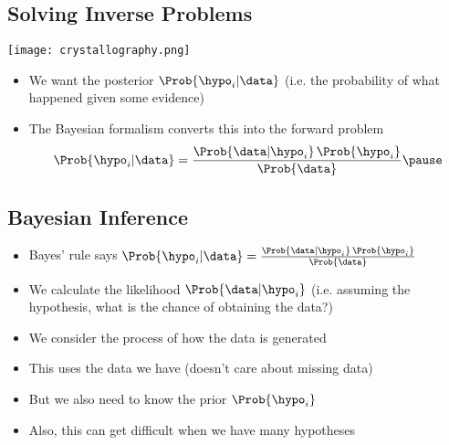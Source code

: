 \begin{slide}
\section[-1]{Solving Inverse Problems}

\begin{PauseHighLight}

\begin{center}
  \texttt{[image: crystallography.png]}
\end{center}
\begin{itemize}\squeeze
\item We want the posterior $\Prob{\hypo_i|\data}$ (i.e. the probability of
  what happened given some evidence)\pause
\item The Bayesian formalism converts this into the forward problem
\begin{align*}
\Prob{\hypo_i|\data} = \frac{\Prob{\data|\hypo_i}\,\Prob{\hypo_i}}{\Prob{\data}}\pause
\end{align*}
\end{itemize}

\end{PauseHighLight}
\end{slide}


\begin{slide}
\section{Bayesian Inference}

\begin{PauseHighLight}
  \begin{itemize}
  \item Bayes' rule says $\Prob{\hypo_i|\data} =
    \frac{\Prob{\data|\hypo_i}\,\Prob{\hypo_i}}{\Prob{\data}}$\pause
  \item We calculate the likelihood $\Prob{\data|\hypo_i}$ (i.e. assuming the
    hypothesis, what is the chance of obtaining the data?)\pause
  \item We consider the process of how the data is generated\pause
  \item This uses the data we have (doesn't care about missing data)\pause
  \item But we also need to know the prior $\Prob{\hypo_i}$\pause
  \item Also, this can get difficult when we have many hypotheses\pause
  \end{itemize}
\end{PauseHighLight}

\end{slide}

